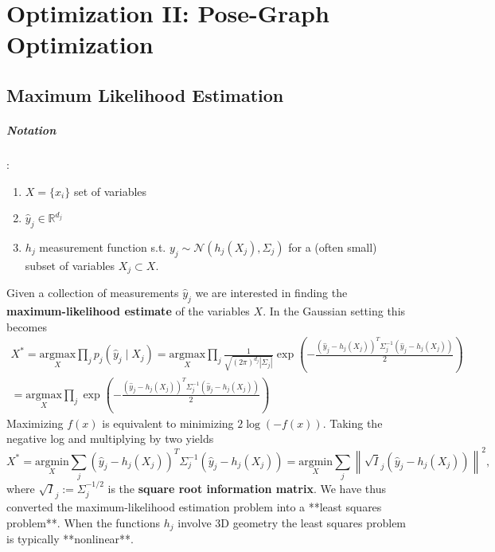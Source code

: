 
\chapter{Optimization II: Pose-Graph Optimization}

\section{Maximum Likelihood Estimation}

\paragraph{Notation}:

\begin{enumerate}
  \item $X = \{ x_i \}$ set of variables
  \item $\hat y_j \in \mathbb{R}^{d_j}$
  \item $h_j$ measurement function s.t. $y_j \sim \mathcal N (h_j(X_j), \Sigma_j)$ for a (often small) subset of variables $X_j \subset X$.
\end{enumerate}


Given a collection of measurements $\hat y_j$ we are interested in finding the \textbf{maximum-likelihood estimate} of the variables $X$. In the Gaussian setting this becomes
$$
\begin{aligned}
  X^* = \underset{X}{\textrm{argmax}} \prod_{j} p_j(\hat y_j \mid X_j) = \underset{X}{\textrm{argmax}} \prod_j \frac{1}{\sqrt{ (2 \pi)^{d_j} |\Sigma_j|}} \exp \left( - \frac{(\hat y_j - h_j(X_j))^T \Sigma_j^{-1} (\hat y_j - h_j(X_j))}{2} \right) \\
= \underset{X}{\textrm{argmax}} \prod_j \exp \left( - \frac{(\hat y_j - h_j(X_j))^T \Sigma_j^{-1} (\hat y_j - h_j(X_j))}{2} \right)
\end{aligned}
$$
Maximizing $f(x)$ is equivalent to minimizing $2 \log(-f(x))$. Taking the negative log and multiplying by two yields
$$
  X^* = \underset{X}{\textrm{argmin}} \sum_j (\hat y_j - h_j(X_j))^T \Sigma_j^{-1} (\hat y_j - h_j(X_j)) = \underset{X}{\textrm{argmin}} \sum_j \left\| \sqrt{I}_j \left( \hat y_j - h_j(X_j) \right) \right\|^2,
$$
where $\sqrt{I}_j := \Sigma_j^{-1/2}$ is the \textbf{square root information matrix}. We have thus converted the maximum-likelihood estimation problem into a **least squares problem**. When the functions $h_j$  involve 3D geometry the least squares problem is typically **nonlinear**.


